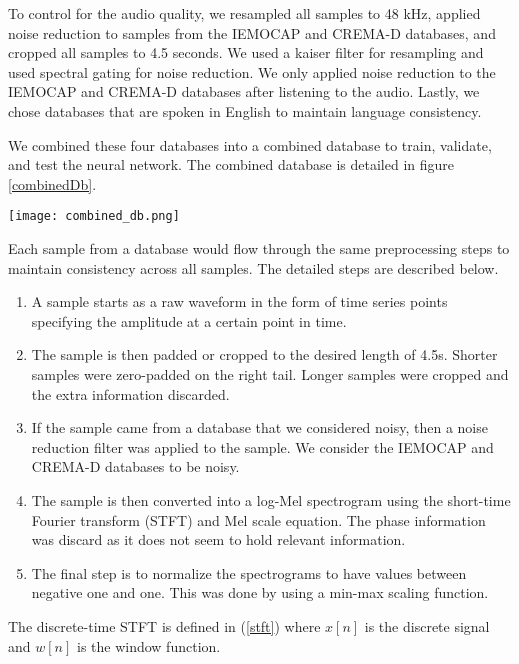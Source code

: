 To control for the audio quality, we resampled all samples to 48 kHz, applied noise reduction to samples from the IEMOCAP and CREMA-D databases, and cropped all samples to 4.5 seconds. We used a kaiser filter for resampling and used spectral gating for noise reduction. We only applied noise reduction to the IEMOCAP and CREMA-D databases after listening to the audio. Lastly, we chose databases that are spoken in English to maintain language consistency.

We combined these four databases into a combined database to train, validate, and test the neural network. The combined database is detailed in figure \ref{combinedDb}.

\begin{figure*}
	\centering
	\hspace{6mm}
	\texttt{[image: combined\_db.png]} 
	\caption{Proportions of each database, emotion, and label types in the combined database.}
	\label{combinedDb}
\end{figure*}

Each sample from a database would flow through the same preprocessing steps to maintain consistency across all samples. The detailed steps are described below.
\begin{enumerate}
	\item A sample starts as a raw waveform in the form of time series points specifying the amplitude at a certain point in time.
	\item The sample is then padded or cropped to the desired length of 4.5s. Shorter samples were zero-padded on the right tail. Longer samples were cropped and the extra information discarded.
	\item If the sample came from a database that we considered noisy, then a noise reduction filter was applied to the sample. We consider the IEMOCAP and CREMA-D databases to be noisy.
	\item The sample is then converted into a log-Mel spectrogram using the short-time Fourier transform (STFT) and Mel scale equation. The phase information was discard as it does not seem to hold relevant information. \cite{Kozakowski2017}
	\item The final step is to normalize the spectrograms to have values between negative one and one. This was done by using a min-max scaling function.
\end{enumerate}

The discrete-time STFT is defined in (\ref{stft}) where $x[n]$ is the discrete signal and $w[n]$ is the window function.


